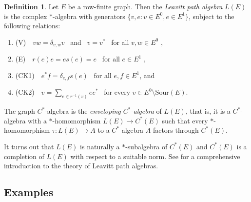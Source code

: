\documentclass[11pt]{amsart}
\theoremstyle{plain}            %
\theoremstyle{definition}       %
\newtheorem{definition}[theorem]{Definition}
\theoremstyle{definition}       %
\theoremstyle{remark}
\newcommand{\Sour}{\mathrm{Sour}}
\begin{document}
    \begin{definition}
   	\label{def:graphCalg}
   	Let $E$ be a row-finite graph. Then the {\it Leavitt path algebra} $L(E)$ is the complex $*$-algebra with generators $\{ v, e :  v\in E^0, e\in E^1 \}$, subject to the
   	following relations:
   	\begin{enumerate}
   		\item[] (V)\ \ $vw = \delta_{v,w}v$ \ and \ $v=v^*$ \ for all $v,w \in E^0$ ,
   		\item[] (E)\ \ $r(e)e=es(e)=e$ \ for all $e\in E^1$ ,
   		\item[] (CK1)\ \ $e^*f=\delta _{e,f} s(e)$ \ for all $e,f\in E^1$, and
   		\item[] (CK2)\ \ $v=\sum _{ e\in r^{-1}(v) }ee^*$ \ for every $v\in E^0\setminus \Sour (E)$.
   	\end{enumerate}
   
   The graph $C^*$-algebra is the {\it enveloping $C^*$-algebra} of $L(E)$, that is, it is a $C^*$-algebra with a $*$-homomorphism $L(E)\to C^*(E)$ such that every $*$-homomorphism $\tau\colon L(E)\to A$ to a $C^*$-algebra $A$ factors through $C^*(E)$.  
   	\end{definition}

It turns out that $L(E)$ is naturally a $*$-subalgebra of $C^*(E)$ and $C^*(E)$ is a completion of $L(E)$ with respect to a suitable norm. See \cite{AAS} for a comprehensive introduction to the theory of Leavitt path algebras.  


\subsection{Examples}
\end{document}
